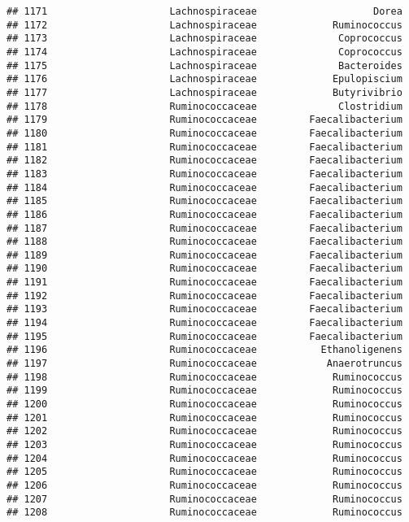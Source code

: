\documentclass[
]{article}
\begin{document}
\begin{verbatim}
## 1171                     Lachnospiraceae                    Dorea
## 1172                     Lachnospiraceae             Ruminococcus
## 1173                     Lachnospiraceae              Coprococcus
## 1174                     Lachnospiraceae              Coprococcus
## 1175                     Lachnospiraceae              Bacteroides
## 1176                     Lachnospiraceae             Epulopiscium
## 1177                     Lachnospiraceae             Butyrivibrio
## 1178                     Ruminococcaceae              Clostridium
## 1179                     Ruminococcaceae         Faecalibacterium
## 1180                     Ruminococcaceae         Faecalibacterium
## 1181                     Ruminococcaceae         Faecalibacterium
## 1182                     Ruminococcaceae         Faecalibacterium
## 1183                     Ruminococcaceae         Faecalibacterium
## 1184                     Ruminococcaceae         Faecalibacterium
## 1185                     Ruminococcaceae         Faecalibacterium
## 1186                     Ruminococcaceae         Faecalibacterium
## 1187                     Ruminococcaceae         Faecalibacterium
## 1188                     Ruminococcaceae         Faecalibacterium
## 1189                     Ruminococcaceae         Faecalibacterium
## 1190                     Ruminococcaceae         Faecalibacterium
## 1191                     Ruminococcaceae         Faecalibacterium
## 1192                     Ruminococcaceae         Faecalibacterium
## 1193                     Ruminococcaceae         Faecalibacterium
## 1194                     Ruminococcaceae         Faecalibacterium
## 1195                     Ruminococcaceae         Faecalibacterium
## 1196                     Ruminococcaceae           Ethanoligenens
## 1197                     Ruminococcaceae            Anaerotruncus
## 1198                     Ruminococcaceae             Ruminococcus
## 1199                     Ruminococcaceae             Ruminococcus
## 1200                     Ruminococcaceae             Ruminococcus
## 1201                     Ruminococcaceae             Ruminococcus
## 1202                     Ruminococcaceae             Ruminococcus
## 1203                     Ruminococcaceae             Ruminococcus
## 1204                     Ruminococcaceae             Ruminococcus
## 1205                     Ruminococcaceae             Ruminococcus
## 1206                     Ruminococcaceae             Ruminococcus
## 1207                     Ruminococcaceae             Ruminococcus
## 1208                     Ruminococcaceae             Ruminococcus

\end{verbatim}
\end{document}
